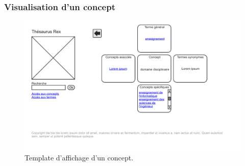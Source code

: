 \subsubsection{Visualisation d'un concept}
\begin{figure}[H]
\begin{center}
\includegraphics[width=\textwidth]{files/template_concept}
\end{center}
\caption{Template d'affichage d'un concept.}
\end{figure}

